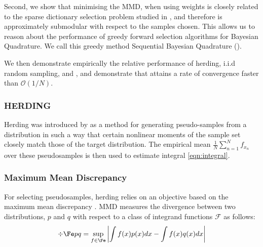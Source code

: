 Second, we show that minimising the MMD, when using \bq{} weights is closely related to the sparse dictionary selection problem studied in \citep{KrauseCevher10}, and therefore is approximately submodular with respect to the samples chosen. This allows us to reason about the performance of greedy forward selection algorithms for Bayesian Quadrature. We call this greedy method Sequential Bayesian Quadrature (\sbq{}).

We then demonstrate empirically the relative performance of herding, i.i.d random sampling, and \sbq{}, and demonstrate that \sbq{} attains a rate of convergence faster than $\mathcal{O}(1/N)$.



\subsubsection{HERDING} 

Herding was introduced by \cite{welling2009herding} as a method for generating pseudo-samples from a distribution in such a way that certain nonlinear moments of the sample set closely match those of the target distribution.  The empirical mean $\frac{1}{N}\sum_{n=1}^{N}f_{x_n}$ over these pseudosamples is then used to estimate integral \ref{eqn:integral}.

\subsubsection{Maximum Mean Discrepancy}

For selecting pseudosamples, herding relies on an objective based on the maximum mean discrepancy \citep[MMD;\ ][]{Sriperumbudur2010}. MMD measures the divergence between two distributions, $p$ and $q$ with respect to a class of integrand functions $\mathcal{F}$ as follows:
%
\begin{align}
	\div{\Fe}{p}{q} = \sup_{f\in\Fe}\left\vert\int f(x) p(x) dx - \int f(x) q(x) dx \right\vert
\end{align}

